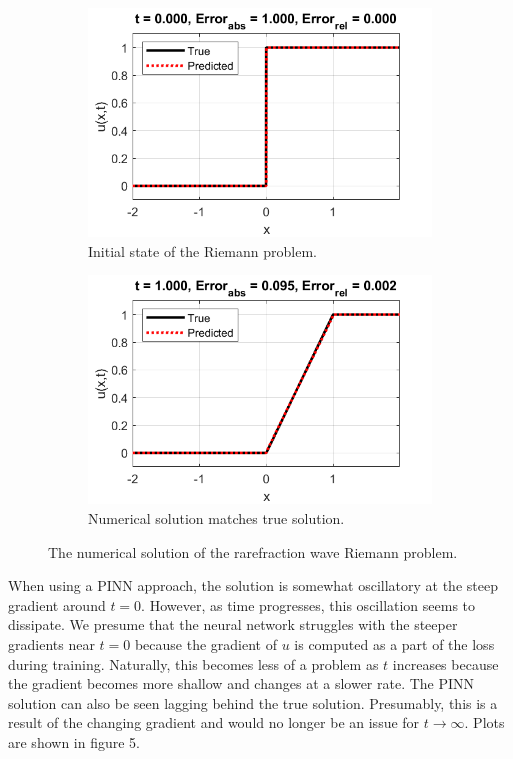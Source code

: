 \documentclass{myproject}
\begin{document}
\begin{figure}
\centering
    \begin{subfigure}{.48\textwidth}
        \centering
        \includegraphics[width=1.0\textwidth]{t0_rarefraction.png}
        \caption{Initial state of the Riemann problem.}
    \end{subfigure}\hfill
    \begin{subfigure}{.48\textwidth}
        \centering
        \includegraphics[width=1\textwidth]{t1_rarefraction.png}
        \caption{Numerical solution matches true solution.}
    \end{subfigure}
    \caption{The numerical solution of the rarefraction wave Riemann problem.}
\end{figure}

When using a PINN approach, the solution is somewhat oscillatory at the steep gradient around $t=0$. However, as time progresses, this oscillation seems to dissipate. We presume that the neural network struggles with the steeper gradients near $t=0$ because the gradient of $u$ is computed as a part of the loss during training. Naturally, this becomes less of a problem as $t$ increases because the gradient becomes more shallow and changes at a slower rate. The PINN solution can also be seen lagging behind the true solution. Presumably, this is a result of the changing gradient and would no longer be an issue for $t \rightarrow \infty $.  Plots are shown in figure 5.
\end{document}
